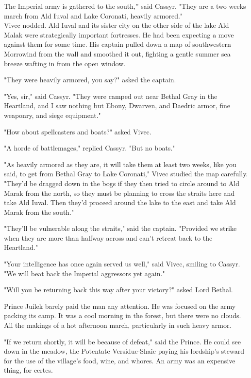 \clearpage
{}

\dropcap The Imperial army is gathered to the south,'' said Cassyr. "They are a two weeks march from Ald Iuval and Lake Coronati, heavily armored."\\Vivec nodded. Ald Iuval and its sister city on the other side of the lake Ald Malak were strategically important fortresses. He had been expecting a move against them for some time. His captain pulled down a map of southwestern Morrowind from the wall and smoothed it out, fighting a gentle summer sea breeze wafting in from the open window.

"They were heavily armored, you say?" asked the captain.

"Yes, sir," said Cassyr. "They were camped out near Bethal Gray in the Heartland, and I saw nothing but Ebony, Dwarven, and Daedric armor, fine weaponry, and siege equipment."

"How about spellcasters and boats?" asked Vivec.

"A horde of battlemages," replied Cassyr. "But no boats."

"As heavily armored as they are, it will take them at least two weeks, like you said, to get from Bethal Gray to Lake Coronati," Vivec studied the map carefully. "They'd be dragged down in the bogs if they then tried to circle around to Ald Marak from the north, so they must be planning to cross the straits here and take Ald Iuval. Then they'd proceed around the lake to the east and take Ald Marak from the south."

"They'll be vulnerable along the straits," said the captain. "Provided we strike when they are more than halfway across and can't retreat back to the Heartland."

"Your intelligence has once again served us well," said Vivec, smiling to Cassyr. "We will beat back the Imperial aggressors yet again."

"Will you be returning back this way after your victory?" asked Lord Bethal.

Prince Juilek barely paid the man any attention. He was focused on the army packing its camp. It was a cool morning in the forest, but there were no clouds. All the makings of a hot afternoon march, particularly in such heavy armor.

"If we return shortly, it will be because of defeat," said the Prince. He could see down in the meadow, the Potentate Versidue-Shaie paying his lordship's steward for the use of the village's food, wine, and whores. An army was an expensive thing, for certes.

